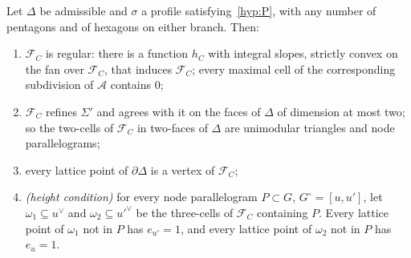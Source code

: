 \begin{proposition}\label{prop:pulling}
Let $\Delta$ be admissible and $\sigma$ a profile satisfying~\ref{hyp:P}, with any number of pentagons and of hexagons on either
branch. Then:
\begin{enumerate}
\item $\mathcal F_C$ is regular: there is a function $h_C$ with integral slopes, strictly convex on the fan over $\mathcal F_C$, that induces
$\mathcal F_C$; every maximal cell of the corresponding subdivision of $\mathcal A$ contains $0$;
\item $\mathcal F_C$ refines $\Sigma'$ and agrees with it on the faces of $\Delta$ of dimension at most two; so the two-cells of $\mathcal F_C$ in
two-faces of $\Delta$ are unimodular triangles and node parallelograms;
\item every lattice point of $\partial\Delta$ is a vertex of $\mathcal F_C$;
\item \emph{(height condition)} for every node parallelogram $P\subset G$, $G^\circ=[u,u']$, let $\omega_1\subseteq u^\vee$ and
$\omega_2\subseteq u'^\vee$ be the three-cells of $\mathcal F_C$ containing $P$. Every lattice point of $\omega_1$ not in $P$ has $e_{u'}=1$, and
every lattice point of $\omega_2$ not in $P$ has $e_u=1$.
\end{enumerate}
\end{proposition}

